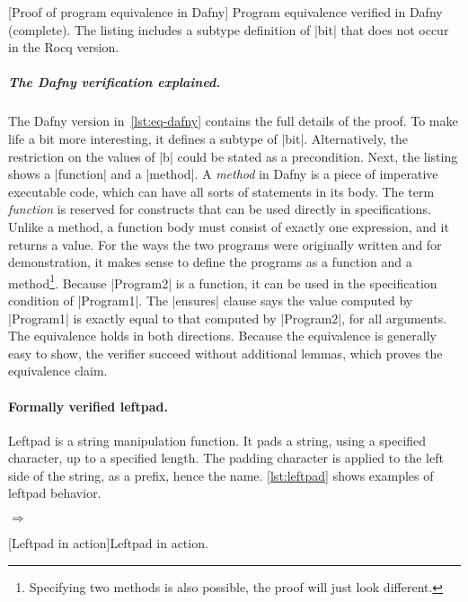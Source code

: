 \begin{center}
\begin{minipage}{\textwidth}
\captionsetup{type=lstlisting}
[Proof of program equivalence in Dafny]{
Program equivalence verified in Dafny (complete).
The listing includes a subtype definition of \pr|bit| that does not occur in the Rocq version.}
\label{lst:eq-dafny}
\end{minipage}
\end{center}

\subparagraph*{The Dafny verification explained.}
The Dafny version in~\autoref{lst:eq-dafny} contains the full details of the proof.
To make life a bit more interesting, it defines a subtype of \pr|bit|.
Alternatively, the restriction on the values of \pr|b| could be stated as a precondition.
Next, the listing shows a \pr|function| and a \pr|method|.
A \emph{method} in Dafny is a piece of imperative executable code, which can have all sorts of statements in its body.
The term \emph{function} is reserved for constructs that can be used directly in specifications.
Unlike a method, a function body must consist of exactly one expression, and it returns a value.
For the ways the two programs were originally written and for demonstration,
it makes sense to define the programs as a function and a method\footnote{
Specifying two methods is also possible, the proof will just look different.}.
Because \pr|Program2| is a function, it can be used in the specification condition of \pr|Program1|.
The \pr|ensures| clause says the value computed by \pr|Program1| is exactly equal to that
computed by \pr|Program2|, for all arguments.
The equivalence holds in both directions.
Because the equivalence is generally easy to show, the verifier succeed without additional lemmas,
which proves the equivalence claim.

\paragraph{Formally verified leftpad.}
Leftpad is a string manipulation function.
It pads a string, using a specified character, up to a specified length.
The padding character is applied to the left side of the string, as a prefix, hence the name.
\autoref{lst:leftpad} shows examples of leftpad behavior.

\begin{center}
\captionsetup{type=lstlisting}
\begin{minipage}{\textwidth}
\begin{minipage}{.45\textwidth}
\end{minipage}%
\hfill\(\Rightarrow\)\hfill%
\begin{minipage}{.45\textwidth}
\end{minipage}
\end{minipage}
[Leftpad in action]{Leftpad in action.}
\label{lst:leftpad}
\end{center}

